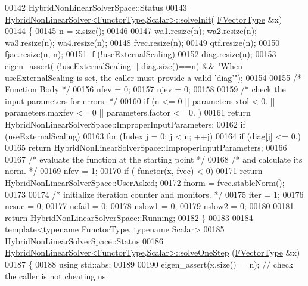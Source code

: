 \begin{DoxyCode}
00142 HybridNonLinearSolverSpace::Status
00143 \hyperlink{class_eigen_1_1_hybrid_non_linear_solver}{HybridNonLinearSolver<FunctorType,Scalar>::solveInit}(
      \hyperlink{group___core___module}{FVectorType}  &x)
00144 \{
00145     n = x.size();
00146 
00147     wa1.\hyperlink{class_eigen_1_1_plain_object_base_a99d9054ee2d5a40c6e00ded0265e9cea}{resize}(n); wa2.resize(n); wa3.resize(n); wa4.resize(n);
00148     fvec.resize(n);
00149     qtf.resize(n);
00150     fjac.resize(n, n);
00151     \textcolor{keywordflow}{if} (!useExternalScaling)
00152         diag.resize(n);
00153     eigen\_assert( (!useExternalScaling || diag.size()==n) && \textcolor{stringliteral}{"When useExternalScaling is set, the caller
       must provide a valid 'diag'"});
00154 
00155     \textcolor{comment}{/* Function Body */}
00156     nfev = 0;
00157     njev = 0;
00158 
00159     \textcolor{comment}{/*     check the input parameters for errors. */}
00160     \textcolor{keywordflow}{if} (n <= 0 || parameters.xtol < 0. || parameters.maxfev <= 0 || parameters.factor <= 0. )
00161         \textcolor{keywordflow}{return} HybridNonLinearSolverSpace::ImproperInputParameters;
00162     \textcolor{keywordflow}{if} (useExternalScaling)
00163         \textcolor{keywordflow}{for} (Index j = 0; j < n; ++j)
00164             \textcolor{keywordflow}{if} (diag[j] <= 0.)
00165                 \textcolor{keywordflow}{return} HybridNonLinearSolverSpace::ImproperInputParameters;
00166 
00167     \textcolor{comment}{/*     evaluate the function at the starting point */}
00168     \textcolor{comment}{/*     and calculate its norm. */}
00169     nfev = 1;
00170     \textcolor{keywordflow}{if} ( functor(x, fvec) < 0)
00171         \textcolor{keywordflow}{return} HybridNonLinearSolverSpace::UserAsked;
00172     fnorm = fvec.stableNorm();
00173 
00174     \textcolor{comment}{/*     initialize iteration counter and monitors. */}
00175     iter = 1;
00176     ncsuc = 0;
00177     ncfail = 0;
00178     nslow1 = 0;
00179     nslow2 = 0;
00180 
00181     \textcolor{keywordflow}{return} HybridNonLinearSolverSpace::Running;
00182 \}
00183 
00184 \textcolor{keyword}{template}<\textcolor{keyword}{typename} FunctorType, \textcolor{keyword}{typename} Scalar>
00185 HybridNonLinearSolverSpace::Status
00186 \hyperlink{class_eigen_1_1_hybrid_non_linear_solver}{HybridNonLinearSolver<FunctorType,Scalar>::solveOneStep}
      (\hyperlink{group___core___module}{FVectorType}  &x)
00187 \{
00188     \textcolor{keyword}{using} std::abs;
00189     
00190     eigen\_assert(x.size()==n); \textcolor{comment}{// check the caller is not cheating us}

\end{DoxyCode}
